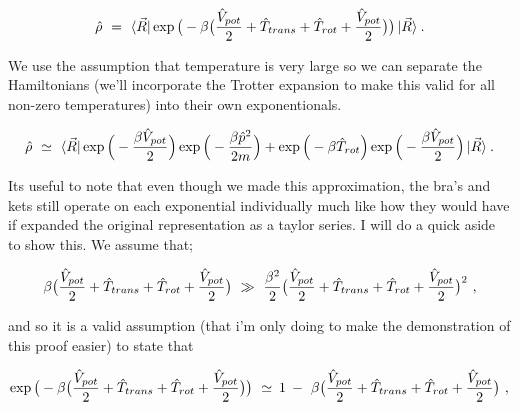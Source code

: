 \documentclass{article}
\begin{document}
\begin{equation} \label{eb-eq-1-220}
\hat{\rho} \hspace{0.125cm} = \hspace{0.125cm} \bra{\vec{R}} \exp \big( - \beta \big( \frac{\hat{V}_{pot}}{2} + \hat{T}_{trans} + \hat{T}_{rot} + \frac{\hat{V}_{pot}}{2} \big) \big) \ket{\vec{R}} \hspace{0.025cm} . 
\end{equation}

We use the assumption that temperature is very large so we can separate the Hamiltonians (we'll incorporate the Trotter expansion to make this valid for all non-zero temperatures) into their own exponentionals. 

\begin{equation} \label{eb-eq-1-221}
\hat{\rho} \hspace{0.125cm} \simeq \hspace{0.125cm} \bra{\vec{R}} \exp \Big( - \frac{ \beta \hat{V}_{pot}}{2} \Big) \exp \Big( - \frac{\beta \hat{p}^2}{2 m} \Big)  + \exp \Big( - \beta \hat{T}_{rot} \Big) \exp \Big( - \frac{ \beta \hat{V}_{pot}}{2} \Big)  \ket{\vec{R}} \hspace{0.025cm} . \end{equation}

Its useful to note that even though we made this approximation, the bra's and kets still operate on each exponential individually much like how they would have if expanded the original representation as a taylor series. I will do a quick aside to show this. We assume that;

\begin{equation} \label{eb-eq-1-222}
\beta \big( \frac{\hat{V}_{pot}}{2} + \hat{T}_{trans} + \hat{T}_{rot} + \frac{\hat{V}_{pot}}{2} \big)  \hspace{0.125cm} \gg \hspace{0.125cm} \frac{\beta^2}{2} \big( \frac{\hat{V}_{pot}}{2} + \hat{T}_{trans} + \hat{T}_{rot} + \frac{\hat{V}_{pot}}{2} \big)^2 \hspace{0.125cm} ,
\end{equation}

and so it is a valid assumption (that i'm only doing to make the demonstration of this proof easier) to state that

\begin{equation} \label{eb-eq-1-223}
\exp \big( - \beta \big( \frac{\hat{V}_{pot}}{2} + \hat{T}_{trans} + \hat{T}_{rot} + \frac{\hat{V}_{pot}}{2} \big) \big) \hspace{0.125cm} \simeq \hspace{0.075cm} 1 \hspace{0.075cm} - \hspace{0.125cm} \beta \big( \frac{\hat{V}_{pot}}{2} + \hat{T}_{trans} + \hat{T}_{rot} + \frac{\hat{V}_{pot}}{2} \big) \hspace{0.125cm} ,
\end{equation}
\end{document}
